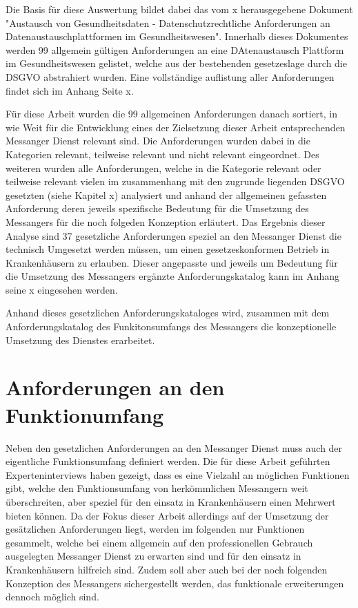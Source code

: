 Die Basis für diese Auswertung bildet dabei das vom x herausgegebene Dokument "Austausch von Gesundheitsdaten - Datenschutzrechtliche Anforderungen an Datenaustauschplattformen im Gesundheitswesen". Innerhalb dieses Dokumentes werden 99 allgemein gültigen Anforderungen an eine DAtenaustausch Plattform im Gesundheitswesen gelistet, welche aus der bestehenden gesetzeslage durch die DSGVO abstrahiert wurden.
Eine vollständige auflistung aller Anforderungen findet sich im Anhang Seite x.

Für diese Arbeit wurden die 99 allgemeinen Anforderungen danach sortiert, in wie Weit für die Entwicklung eines der Zielsetzung dieser Arbeit entsprechenden Messanger Dienst relevant sind. Die Anforderungen wurden dabei in die Kategorien relevant, teilweise relevant und nicht relevant eingeordnet. Des weiteren wurden alle Anforderungen, welche in die Kategorie relevant oder teilweise relevant vielen im zusammenhang mit den zugrunde liegenden DSGVO gesetzten (siehe Kapitel x) analysiert und anhand der allgemeinen gefassten Anforderung deren jeweils spezifische Bedeutung für die Umsetzung des Messangers für die noch folgeden Konzeption erläutert. Das Ergebnis dieser Analyse sind 37 gesetzliche Anforderungen speziel an den Messanger Dienst die technisch Umgesetzt werden müssen, um einen gesetzeskonformen Betrieb in Krankenhäusern zu erlauben. Dieser angepasste und jeweils um Bedeutung für die Umsetzung des Messangers ergänzte Anforderungskatalog kann im Anhang seine x eingesehen werden.

Anhand dieses gesetzlichen Anforderungskataloges wird, zusammen mit dem Anforderungskatalog des Funkitonsumfangs des Messangers die konzeptionelle Umsetzung des Dienstes erarbeitet.

\section{Anforderungen an den Funktionumfang}\label{section:pdimsbd}
Neben den gesetzlichen Anforderungen an den Messanger Dienst muss auch der eigentliche Funktionsumfang definiert werden. Die für diese Arbeit geführten Experteninterviews haben gezeigt, dass es eine Vielzahl an möglichen Funktionen gibt, welche den Funktionsumfang von herkömmlichen Messangern weit überschreiten, aber speziel für den einsatz in Krankenhäusern einen Mehrwert bieten können.
Da der Fokus dieser Arbeit allerdings auf der Umsetzung der gesätzlichen Anforderungen liegt, werden im folgenden nur Funktionen gesammelt, welche bei einem allgemein auf den professionellen Gebrauch ausgelegten Messanger Dienst zu erwarten sind und für den einsatz in Krankenhäusern hilfreich sind. Zudem soll aber auch bei der noch folgenden Konzeption des Messangers sichergestellt werden, das funktionale erweiterungen dennoch möglich sind.

